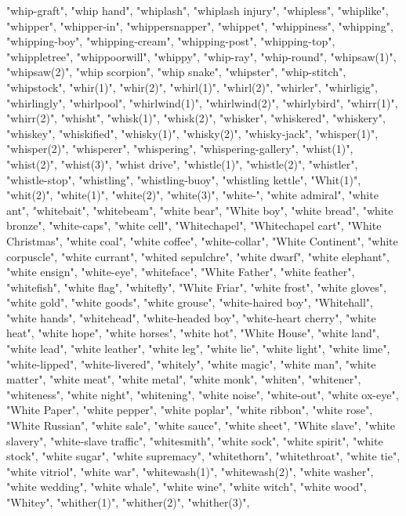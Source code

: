 "whip-graft",
"whip hand",
"whiplash",
"whiplash injury",
"whipless",
"whiplike",
"whipper",
"whipper-in",
"whippersnapper",
"whippet",
"whippiness",
"whipping",
"whipping-boy",
"whipping-cream",
"whipping-post",
"whipping-top",
"whippletree",
"whippoorwill",
"whippy",
"whip-ray",
"whip-round",
"whipsaw(1)",
"whipsaw(2)",
"whip scorpion",
"whip snake",
"whipster",
"whip-stitch",
"whipstock",
"whir(1)",
"whir(2)",
"whirl(1)",
"whirl(2)",
"whirler",
"whirligig",
"whirlingly",
"whirlpool",
"whirlwind(1)",
"whirlwind(2)",
"whirlybird",
"whirr(1)",
"whirr(2)",
"whisht",
"whisk(1)",
"whisk(2)",
"whisker",
"whiskered",
"whiskery",
"whiskey",
"whiskified",
"whisky(1)",
"whisky(2)",
"whisky-jack",
"whisper(1)",
"whisper(2)",
"whisperer",
"whispering",
"whispering-gallery",
"whist(1)",
"whist(2)",
"whist(3)",
"whist drive",
"whistle(1)",
"whistle(2)",
"whistler",
"whistle-stop",
"whistling",
"whistling-buoy",
"whistling kettle",
"Whit(1)",
"whit(2)",
"white(1)",
"white(2)",
"white(3)",
"white-",
"white admiral",
"white ant",
"whitebait",
"whitebeam",
"white bear",
"White boy",
"white bread",
"white bronze",
"white-caps",
"white cell",
"Whitechapel",
"Whitechapel cart",
"White Christmas",
"white coal",
"white coffee",
"white-collar",
"White Continent",
"white corpuscle",
"white currant",
"whited sepulchre",
"white dwarf",
"white elephant",
"white ensign",
"white-eye",
"whiteface",
"White Father",
"white feather",
"whitefish",
"white flag",
"whitefly",
"White Friar",
"white frost",
"white gloves",
"white gold",
"white goods",
"white grouse",
"white-haired boy",
"Whitehall",
"white hands",
"whitehead",
"white-headed boy",
"white-heart cherry",
"white heat",
"white hope",
"white horses",
"white hot",
"White House",
"white land",
"white lead",
"white leather",
"white leg",
"white lie",
"white light",
"white lime",
"white-lipped",
"white-livered",
"whitely",
"white magic",
"white man",
"white matter",
"white meat",
"white metal",
"white monk",
"whiten",
"whitener",
"whiteness",
"white night",
"whitening",
"white noise",
"white-out",
"white ox-eye",
"White Paper",
"white pepper",
"white poplar",
"white ribbon",
"white rose",
"White Russian",
"white sale",
"white sauce",
"white sheet",
"White slave",
"white slavery",
"white-slave traffic",
"whitesmith",
"white sock",
"white spirit",
"white stock",
"white sugar",
"white supremacy",
"whitethorn",
"whitethroat",
"white tie",
"white vitriol",
"white war",
"whitewash(1)",
"whitewash(2)",
"white washer",
"white wedding",
"white whale",
"white wine",
"white witch",
"white wood",
"Whitey",
"whither(1)",
"whither(2)",
"whither(3)",

